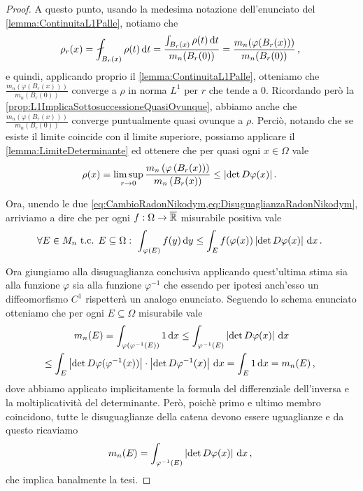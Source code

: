 \begin{proof}
	A questo punto, usando la medesima notazione dell'enunciato del \cref{lemma:ContinuitaL1Palle}, notiamo che
	\begin{equation*}
		\rho_r(x)=\aint_{B_r(x)}\rho(t)\de t=\frac{\int_{B_r(x)} \rho(t)\de t}{m_n(B_r(0))}=\frac{m_n(\varphi(B_r(x)))}{m_n(B_r(0))}\virgola
	\end{equation*}
	e quindi, applicando proprio il \cref{lemma:ContinuitaL1Palle}, otteniamo che $\frac{m_n(\varphi(B_r(x)))}{m_n(B_r(0))}$ converge a $\rho$ in norma $L^1$ per $r$ che tende a $0$.
	Ricordando però la \cref{prop:L1ImplicaSottosuccessioneQuasiOvunque}, abbiamo anche che $\frac{m_n(\varphi(B_r(x)))}{m_n(B_r(0))}$ converge puntualmente quasi ovunque a $\rho$. Perciò, notando che se esiste il limite coincide con il limite superiore, possiamo applicare il \cref{lemma:LimiteDeterminante} ed ottenere che per quasi ogni $x\in\Omega$ vale
	\begin{equation}\label{eq:DisuguaglianzaRadonNikodym}
		\rho(x)=\limsup_{r\to 0} \frac{ m_n\left(\varphi\left(B_r(x)\right)\right)} {m_n\left(B_r(x)\right)}\le \lvert\det D\varphi(x)\rvert \, \text{. }
	\end{equation}
	
	Ora, unendo le due \cref{eq:CambioRadonNikodym,eq:DisuguaglianzaRadonNikodym}, arriviamo a dire che per ogni $f:\Omega\to\overline{\mathbb R}$ misurabile positiva vale
	\begin{equation*}
		\forall E\in M_n\text{ t.c. } E\subseteq\Omega:\ \int_{\varphi(E)} f(y)\,\mathrm d y\le 
		\int_E f(\varphi(x))\left\lvert\det D\varphi(x)\right\rvert\,\mathrm d x \, \text{. }
	\end{equation*}
	
	Ora giungiamo alla disuguaglianza conclusiva applicando quest'ultima stima sia alla funzione $\varphi$ sia alla funzione $\varphi^{-1}$ che essendo per ipotesi anch'esso un diffeomorfismo $C^1$ rispetterà un analogo enunciato.
	Seguendo lo schema enunciato otteniamo che per ogni $E\subseteq\Omega$ misurabile vale
	\begin{multline*}
		m_n(E) =\int_{\varphi(\varphi^{-1}(E))}1\,\mathrm d x\le \int_{\varphi^{-1}(E)} \left\lvert\det D\varphi(x)\right\rvert\,\mathrm d x \\
 		\le \int_E \left\lvert\det D\varphi(\varphi^{-1}(x))\right\rvert \cdot \left\lvert\det D\varphi^{-1}(x)\right\rvert\,\mathrm d x =\int_E 1\,\mathrm d x=m_n(E) \, \text{, }
	\end{multline*}
	dove abbiamo applicato implicitamente la formula del differenziale dell'inversa e la moltiplicatività del determinante.
	Però, poichè primo e ultimo membro coincidono, tutte le disuguaglianze della catena devono essere uguaglianze e da questo ricaviamo
	\begin{equation*}
		m_n(E)=\int_{\varphi^{-1}(E)} \left\lvert\det D\varphi(x)\right\rvert\,\mathrm d x \, \text{, }
	\end{equation*}
	che implica banalmente la tesi.

\end{proof}



